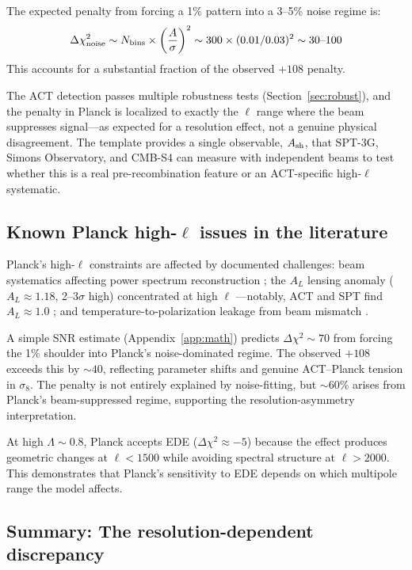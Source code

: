 \documentclass[twocolumn,showpacs,preprintnumbers,amsmath,amssymb,prd]{revtex4-2}
\begin{document}
The expected penalty from forcing a 1\% pattern into a 3--5\% noise regime is:
\begin{equation}
\Delta\chi^2_{\rm noise} \sim N_{\rm bins} \times \left(\frac{A}{\sigma}\right)^2 
\sim 300 \times (0.01/0.03)^2 \sim 30\text{--}100
\end{equation}
This accounts for a substantial fraction of the observed $+108$ penalty.


The ACT detection passes multiple robustness tests (Section~\ref{sec:robust}), 
and the penalty in Planck is localized to exactly the $\ell$ range where the 
beam suppresses signal---as expected for a resolution effect, not a genuine 
physical disagreement. The template provides a single observable, $A_{\rm sh}$, 
that SPT-3G, Simons Observatory, and CMB-S4 can measure with independent beams 
to test whether this is a real pre-recombination feature or an ACT-specific 
high-$\ell$ systematic.

\subsection{Known Planck high-$\ell$ issues in the literature}

Planck's high-$\ell$ constraints are affected by documented challenges: beam 
systematics affecting power spectrum reconstruction \cite{Planck2013VII,Planck2016HFI,Rocha2009}; 
the $A_L$ lensing anomaly ($A_L \approx 1.18$, 2--3$\sigma$ high) concentrated at 
high $\ell$ \cite{Planck2018VI}---notably, ACT and SPT find $A_L \approx 1.0$ 
\cite{ACT2020,SPT2021}; and temperature-to-polarization leakage from beam 
mismatch \cite{Miller2009,Hivon2016,Delouis2019}.

A simple SNR estimate (Appendix~\ref{app:math}) predicts $\Delta\chi^2 \sim 70$ 
from forcing the 1\% shoulder into Planck's noise-dominated regime. The observed 
$+108$ exceeds this by $\sim 40$, reflecting parameter shifts and genuine 
ACT--Planck tension in $\sigma_8$. The penalty is not entirely 
explained by noise-fitting, but $\sim 60$\% arises from Planck's beam-suppressed 
regime, supporting the resolution-asymmetry interpretation.

At high $\Lambda \sim 0.8$, Planck accepts EDE ($\Delta\chi^2 \approx -5$) 
because the effect produces geometric changes at $\ell < 1500$ while avoiding 
spectral structure at $\ell > 2000$. This demonstrates that Planck's sensitivity 
to EDE depends on which multipole range the model affects.

\subsection{Summary: The resolution-dependent discrepancy}
\end{document}
